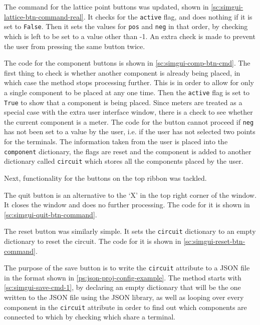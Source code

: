     The command for the lattice point buttons was updated, shown in \autoref{sc:simgui-lattice-btn-command-real}. 
    It checks for the \verb|active| flag, and does nothing if it is set to \verb|False|. 
    Then it sets the values for \verb|pos| and \verb|neg| in that order, by checking which is left to be set to a value other than -1. 
    An extra check is made to prevent the user from pressing the same button twice. 


    
    The code for the component buttons is shown in \autoref{sc:simgui-comp-btn-cmd}. 
    The first thing to check is whether another component is already being placed, in which case the method stops processing further.
    This is in order to allow for only a single component to be placed at any one time. 
    Then the \verb|active| flag is set to \verb|True| to show that a component is being placed. 
    Since meters are treated as a special case with the extra user interface window, there is a check to see whether the current component is a meter. 
    The code for the button cannot proceed if \verb|neg| has not been set to a value by the user, i.e. if the user has not selected two points for the terminals. 
    The information taken from the user is placed into the \verb|component| dictionary, the flags are reset and the component is added to another dictionary called \verb|circuit| which stores all the components placed by the user. 



    Next, functionality for the buttons on the top ribbon was tackled. 



    The quit button is an alternative to the `X' in the top right corner of the window. 
    It closes the window and does no further processing. 
    The code for it is shown in \autoref{sc:simgui-quit-btn-command}. 



    The reset button was similarly simple. 
    It sets the \verb|circuit| dictionary to an empty dictionary to reset the circuit.
    The code for it is shown in \autoref{sc:simgui-reset-btn-command}.

    

    The purpose of the save button is to write the \verb|circuit| attribute to a JSON file in the format shown in \autoref{ps:json-proj-config-example}. 
    The method starts with \autoref{sc:simgui-save-cmd-1}, by declaring an empty dictionary that will be the one written to the JSON file using the JSON library, as well as looping over every component in the \verb|circuit| attribute in order to find out which components are connected to which by checking which share a terminal. 

